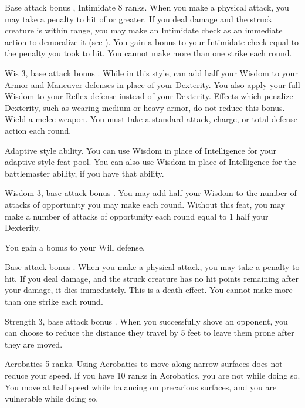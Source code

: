 \featpres Base attack bonus , Intimidate 8 ranks.
\featben When you make a physical attack, you may take a penalty to hit of  or greater. If you deal damage and the struck creature is within \rngmed range, you may make an Intimidate check as an immediate action to demoralize it (see ). You gain a bonus to your Intimidate check equal to the penalty you took to hit. You cannot make more than one strike each round.

\featpre Wis 3, base attack bonus .
\featben While in this style, can add half your Wisdom to your Armor and Maneuver defenses in place of your Dexterity. You also apply your full Wisdom to your Reflex defense instead of your Dexterity. Effects which penalize Dexterity, such as wearing medium or heavy armor, do not reduce this bonus.
\stylereq Wield a melee weapon. You must take a standard attack, charge, or total defense action each round.

\featpre Adaptive style ability.
\featben You can use Wisdom in place of Intelligence for your adaptive style feat pool. You can also use Wisdom in place of Intelligence for the battlemaster ability, if you have that ability.

\featpres Wisdom 3, base attack bonus .
\featben You may add half your Wisdom to the number of attacks of opportunity you may make each round.
 Without this feat, you may make a number of attacks of opportunity each round equal to 1 \add half your Dexterity.

 You gain a  bonus to your Will defense.

\featpre Base attack bonus .
\featben When you make a physical attack, you may take a  penalty to hit. If you deal damage, and the struck creature has no hit points remaining after your damage, it dies immediately. This is a death effect. You cannot make more than one strike each round.

\featpres Strength 3, base attack bonus .
\featben When you successfully shove an opponent, you can choose to reduce the distance they travel by 5 feet to leave them prone after they are moved.

\featpre Acrobatics 5 ranks.
\featben Using Acrobatics to move along narrow surfaces does not reduce your speed. If you have 10 ranks in Acrobatics, you are not \vulnerable while doing so.
 You move at half speed while balancing on precarious surfaces, and you are vulnerable while doing so.

